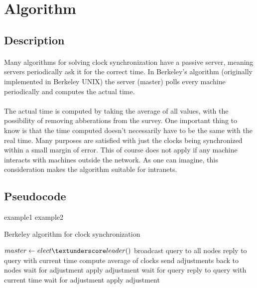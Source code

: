 \documentclass[12pt]{article}
\begin{document}
\section{Algorithm}

\subsection{Description}
\paragraph{}
Many algorithms for solving clock synchronization have a passive server, meaning servers periodically ask it for the correct time. In Berkeley's algorithm (originally implemented in Berkeley UNIX) the server (master) polls every machine periodically and computes the actual time.

\paragraph{}
The actual time is computed by taking the average of all values, with the possibility of removing abberations from the survey. One important thing to know is that the time computed doesn't necessarily have to be the same with the real time. Many purposes are satisfied with just the clocks being synchronized within a small margin of error. This of course does not apply if any machine interacts with machines outside the network. As one can imagine, this consideration makes the algorithm suitable for intranets.


\subsection{Pseudocode}
example1 \cite{tanenbaum2007distributed}
example2 \cite{gusella1989accuracy}

\begin{algorithm}
\caption{Berkeley algorithm for clock synchronization}
\begin{algorithmic}[1]
	\State $master \leftarrow elect \textunderscore leader()$
		\State broadcast query to all nodes
		\State reply to query with current time
		\State compute average of clocks
		\State send adjustments back to nodes
		\State wait for adjustment
		\State apply adjustment
		\State wait for query
		\State reply to query with current time
		\State wait for adjustment
		\State apply adjustment
	\EndIf
\end{algorithmic}
\end{algorithm}
\end{document}

